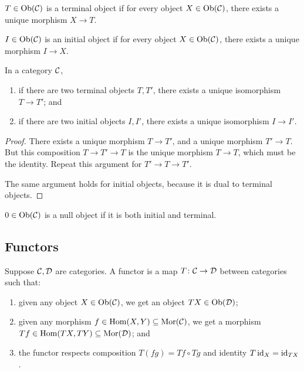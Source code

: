 \begin{definition}
    \(T \in \operatorname{Ob}(\mathcal{C})\) is a terminal object
    if for every object \(X \in \operatorname{Ob}(\mathcal{C})\),
    there exists a unique morphism \(X \to T\).
\end{definition}
\begin{definition}
    \(I \in \operatorname{Ob}(\mathcal{C})\) is an initial object
    if for every object \(X \in \operatorname{Ob}(\mathcal{C})\),
    there exists a unique morphism \(I \to X\).
\end{definition}
\begin{lemma}
    In a category \(\mathcal{C}\),
    \begin{enumerate}[label={(\alph*)}, itemsep=0mm]
        \item if there are two terminal objects \(T,T'\), there exists a unique isomorphism \(T \to T'\); and
        \item if there are two initial objects \(I,I'\), there exists a unique isomorphism \(I \to I'\).
    \end{enumerate}
\end{lemma}
\begin{proof}
    There exists a unique morphism \(T \to T'\), and a unique morphism \(T' \to T\).
    But this composition \(T \to T' \to T\) is the unique morphism \(T \to T\), which must be the identity.
    Repeat this argument for \(T' \to T \to T'\).

    The same argument holds for initial objects, because it is dual to terminal objects.
\end{proof}

\begin{definition}
    \(0 \in \operatorname{Ob}(\mathcal{C})\) is a null object if it is both initial and terminal.
\end{definition}

\subsection*{Functors}

\begin{definition}
    Suppose \(\mathcal{C},\mathcal{D}\) are categories.
    A functor is a map \(T\colon\mathcal{C}\to\mathcal{D}\) between categories
    such that:
    \begin{enumerate}[label={(\roman*)}, itemsep=0mm]
        \item given any object \(X \in \operatorname{Ob}(\mathcal{C})\), we get an object \(TX \in \operatorname{Ob}(\mathcal{D})\);
        \item given any morphism \(f \in \operatorname{Hom}(X,Y) \subseteq \operatorname{Mor}(\mathcal{C})\),
            we get a morphism \(Tf \in \operatorname{Hom}(TX,TY) \subseteq \operatorname{Mor}(\mathcal{D})\); and
        \item the functor respects composition \(T(fg) = Tf \circ Tg\) and identity \(T\operatorname{id}_X = \operatorname{id}_{TX}\).
    \end{enumerate}
\end{definition}

